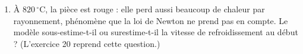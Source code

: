 \documentclass[a4paper,11pt]{article}
\newcommand{\rep}[1]{\par\noindent\begin{minipage}[t][#1cm]{\linewidth}\mbox{}\end{minipage}\par}
\begin{document}
\begin{enumerate}
\begin{enumerate}
    \item Sur le graphique, les points d'Euler sont-ils au-dessus ou au-dessous de la courbe exacte ? À quel moment l'écart semble-t-il le plus grand ? À l'aide de la forme de la courbe, expliquer pourquoi Euler se trompe toujours dans le même sens.
    \item Remplacer \texttt{dt = 5} par \texttt{dt = 1} et relancer. Que constate-t-on sur les valeurs et sur le graphique ?
  \end{enumerate}
  \rep{4}
  \needspace{3.2cm}
  \item À $820\,^\circ$C, la pièce est rouge : elle perd aussi beaucoup de chaleur par rayonnement, phénomène que la loi de Newton ne prend pas en compte. Le modèle sous-estime-t-il ou surestime-t-il la vitesse de refroidissement au début ? (L'exercice 20 reprend cette question.)
  \rep{2}
\end{enumerate}
\end{document}
